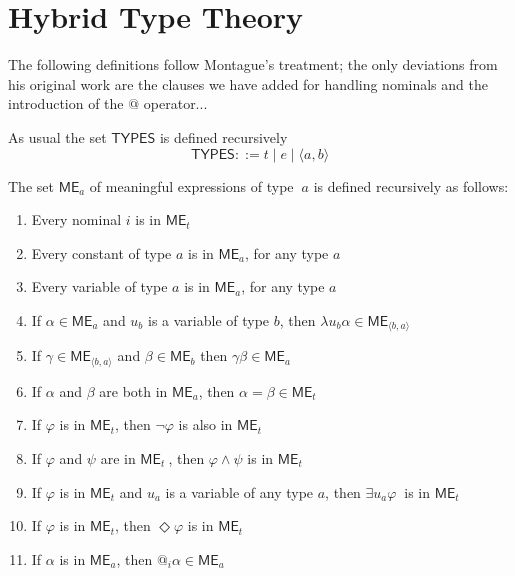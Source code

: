 \section{Hybrid Type Theory}

The following definitions follow Montague's treatment; the only deviations
from his original work are the clauses we have added for handling nominals
and the introduction of the $@$ operator...

As usual the set $\mathsf{TYPES}$ is defined recursively 
\begin{equation*}
\mathsf{TYPES}::=t\mid e\mid \langle a,b\rangle
\end{equation*}

The set $\mathsf{ME}_{a}$ of meaningful expressions of type\textbf{\ }$a$ is
defined recursively as follows:

\begin{enumerate}
\item Every nominal $i$ is in $\mathsf{ME}_{t}$

\item Every constant of type $a$ is in $\mathsf{ME}_{a}$, for any type $a$

\item Every variable of type $a$ is in $\mathsf{ME}_{a}$, for any type $a$

\item If $\alpha \in \mathsf{ME}_{a}$ and $u_{b}$ is a variable of type $b$,
then $\lambda u_{b}\alpha \in \mathsf{ME}_{\langle b,a\rangle }$

\item If $\gamma \in \mathsf{ME}_{\langle b,a\rangle }$ and $\beta \in 
\mathsf{ME}_{b}$ then $\gamma \beta \in \mathsf{ME}_{a}$

\item If $\alpha $ and $\beta $ are both in $\mathsf{ME}_{a}$, then $\alpha
=\beta \in \mathsf{ME}_{t}$

\item If $\varphi $ is in $\mathsf{ME}_{t}$, then $\lnot \varphi $ is also
in $\mathsf{ME}_{t}$

\item If $\varphi $ and $\psi $ are in $\mathsf{ME}_{t}\ $, then $\varphi
\wedge \psi $ is in $\mathsf{ME}_{t}$

\item If $\varphi $ is in $\mathsf{ME}_{t}$ and $u_{a}$ is a variable of any
type $a$, then $\exists u_{a}\varphi $ $\ $is in $\mathsf{ME}_{t}$\textbf{\ }

\item If $\varphi $ is in $\mathsf{ME}_{t}$, then $\Diamond \varphi $ is in $%
\mathsf{ME}_{t}$

\item If $\alpha $ is in $\mathsf{ME}_{a}$, then $@_{i}\alpha \in \mathsf{ME}%
_{a}$
\end{enumerate}

